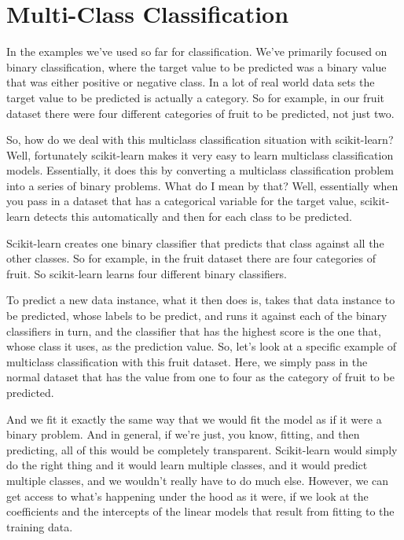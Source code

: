 \section{Multi-Class Classification}
\begin{multicols}{2}

In the examples we've used so far for classification. We've primarily focused on binary classification, where the target value to be predicted was a binary value that was either positive or negative class. In a lot of real world data sets the target value to be predicted is actually a category. So for example, in our fruit dataset there were four different categories of fruit to be predicted, not just two. 

So, how do we deal with this multiclass classification situation with scikit-learn? Well, fortunately scikit-learn makes it very easy to learn multiclass classification models. Essentially, it does this by converting a multiclass classification problem into a series of binary problems. What do I mean by that? Well, essentially when you pass in a dataset that has a categorical variable for the target value, scikit-learn detects this automatically and then for each class to be predicted. 

Scikit-learn creates one binary classifier that predicts that class against all the other classes. So for example, in the fruit dataset there are four categories of fruit. So scikit-learn learns four different binary classifiers. 

To predict a new data instance, what it then does is, takes that data instance to be predicted, whose labels to be predict, and runs it against each of the binary classifiers in turn, and the classifier that has the highest score is the one that, whose class it uses, as the prediction value. So, let's look at a specific example of multiclass classification with this fruit dataset. Here, we simply pass in the normal dataset that has the value from one to four as the category of fruit to be predicted. 

And we fit it exactly the same way that we would fit the model as if it were a binary problem. And in general, if we're just, you know, fitting, and then predicting, all of this would be completely transparent. Scikit-learn would simply do the right thing and it would learn multiple classes, and it would predict multiple classes, and we wouldn't really have to do much else. However, we can get access to what's happening under the hood as it were, if we look at the coefficients and the intercepts of the linear models that result from fitting to the training data. 


\end{multicols}
